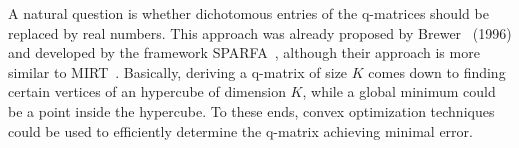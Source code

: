 \documentclass{edm_template}
\begin{document}
A natural question is whether dichotomous entries of the q-matrices should be replaced by real numbers. This approach was already proposed by Brewer~\cite{Barnes2005} (1996) and developed by the framework SPARFA~\cite{Vats2013}, although their approach is more similar to MIRT~\cite{Segall1996}. Basically, deriving a q-matrix of size $K$ comes down to finding certain vertices of an hypercube of dimension $K$, while a global minimum could be a point inside the hypercube. To these ends, convex optimization techniques could be used to efficiently determine the q-matrix achieving minimal error.





\end{document}
